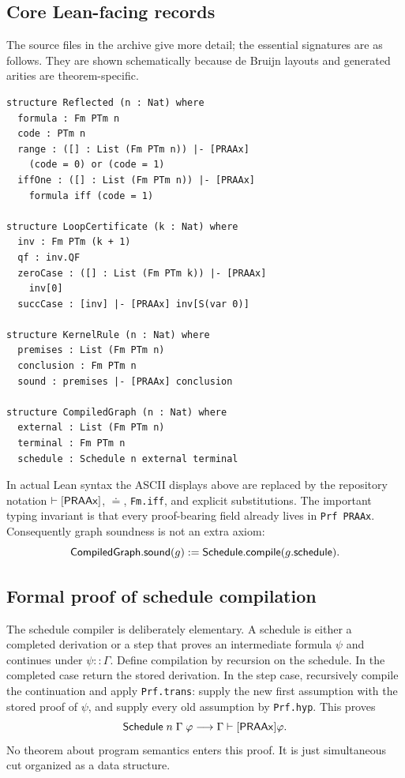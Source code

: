 \subsection{Core Lean-facing records}

The source files in the archive give more detail; the essential signatures are as follows.  They are shown schematically because de Bruijn layouts and generated arities are theorem-specific.

\begin{lstlisting}
structure Reflected (n : Nat) where
  formula : Fm PTm n
  code : PTm n
  range : ([] : List (Fm PTm n)) |- [PRAAx]
    (code = 0) or (code = 1)
  iffOne : ([] : List (Fm PTm n)) |- [PRAAx]
    formula iff (code = 1)

structure LoopCertificate (k : Nat) where
  inv : Fm PTm (k + 1)
  qf : inv.QF
  zeroCase : ([] : List (Fm PTm k)) |- [PRAAx]
    inv[0]
  succCase : [inv] |- [PRAAx] inv[S(var 0)]

structure KernelRule (n : Nat) where
  premises : List (Fm PTm n)
  conclusion : Fm PTm n
  sound : premises |- [PRAAx] conclusion

structure CompiledGraph (n : Nat) where
  external : List (Fm PTm n)
  terminal : Fm PTm n
  schedule : Schedule n external terminal
\end{lstlisting}

In actual Lean syntax the ASCII displays above are replaced by the repository notation \texttt{\(\vdash[\mathsf{PRAAx}]\)}, \texttt{\(\doteq\)}, \texttt{Fm.iff}, and explicit substitutions.  The important typing invariant is that every proof-bearing field already lives in \texttt{Prf PRAAx}.  Consequently graph soundness is not an extra axiom:
\[
  \mathsf{CompiledGraph.sound}(g)\mathrel{:=}
  \mathsf{Schedule.compile}(g.\mathsf{schedule}).
\]

\subsection{Formal proof of schedule compilation}

The schedule compiler is deliberately elementary.  A schedule is either a completed derivation or a step that proves an intermediate formula \(\psi\) and continues under \(\psi::\Gamma\).  Define compilation by recursion on the schedule.  In the completed case return the stored derivation.  In the step case, recursively compile the continuation and apply \texttt{Prf.trans}: supply the new first assumption with the stored proof of \(\psi\), and supply every old assumption by \texttt{Prf.hyp}.  This proves
\[
  \mathsf{Schedule}\;n\;\Gamma\;\varphi
  \longrightarrow
  \Gamma\vdash[\mathsf{PRAAx}]\varphi.
\]
No theorem about program semantics enters this proof.  It is just simultaneous cut organized as a data structure.

